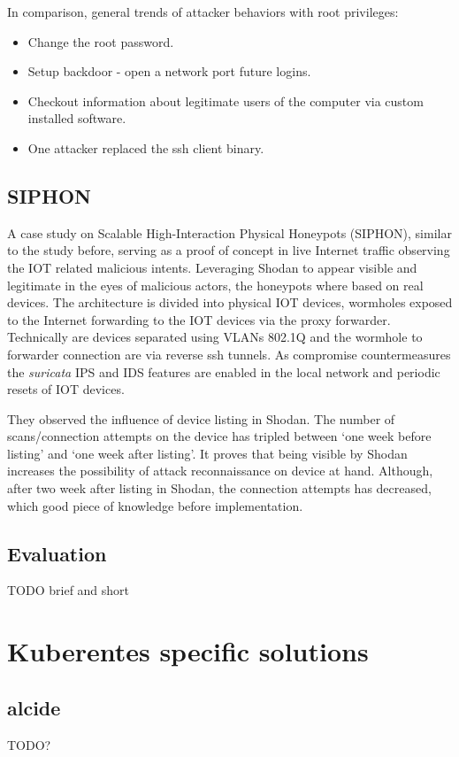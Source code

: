 In comparison, general trends of attacker behaviors with root privileges:
	
\begin{itemize}[noitemsep]
	\item Change the root password.
	\item Setup backdoor - open a network port future logins.
	\item Checkout information about legitimate users of the computer via custom installed software.
	\item One attacker replaced the ssh client binary.
\end{itemize}

\subsection{SIPHON \label{related:active-anal:siphon}}
A case study \cite{study:siphon} on Scalable High-Interaction Physical Honeypots (SIPHON), similar to the study before, serving as a proof of concept in live Internet traffic observing the IOT related malicious intents. Leveraging Shodan to appear visible and legitimate in the eyes of malicious actors, the honeypots where based on real devices. The architecture is divided into physical IOT devices, wormholes exposed to the Internet forwarding to the IOT devices via the proxy forwarder. Technically are devices separated using VLANs 802.1Q and the wormhole to forwarder connection are via reverse ssh tunnels. As compromise countermeasures the \textit{suricata} IPS and IDS features are enabled in the local network and periodic resets of IOT devices.

They observed the influence of device listing in Shodan. The number of scans/connection attempts on the device has tripled between `one week before listing' and `one week after listing'. It proves that being visible by Shodan increases the possibility of attack reconnaissance on device at hand. Although, after two week after listing in Shodan, the connection attempts has decreased, which good piece of knowledge before implementation.

\subsection{Evaluation}
TODO brief and short

\section{Kuberentes specific solutions \label{related:k8s}}

\subsection{alcide \label{related:k8s:alcide}}
TODO?
